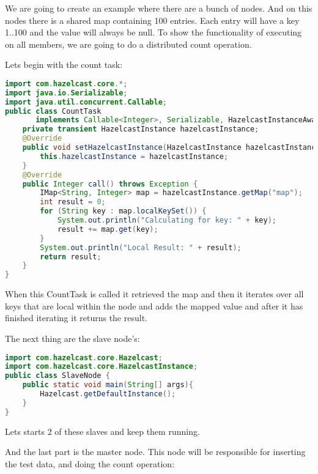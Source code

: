 We are going to create an example where there are a bunch of nodes. And on this nodes there is a shared map containing 100 entries. Each entry will have a key 1..100 and the value will always be null. To show the functionality of executing on all members, we are going to do a distributed count operation.

Lets begin with the count task:
\begin{lstlisting}[language=java]
import com.hazelcast.core.*;
import java.io.Serializable;
import java.util.concurrent.Callable;
public class CountTask 
       implements Callable<Integer>, Serializable, HazelcastInstanceAware {
    private transient HazelcastInstance hazelcastInstance;
    @Override
    public void setHazelcastInstance(HazelcastInstance hazelcastInstance) {
        this.hazelcastInstance = hazelcastInstance;
    }
    @Override
    public Integer call() throws Exception {
        IMap<String, Integer> map = hazelcastInstance.getMap("map");
        int result = 0;
        for (String key : map.localKeySet()) {
            System.out.println("Calculating for key: " + key);
            result += map.get(key);
        }
        System.out.println("Local Result: " + result);
        return result;
    }
}

\end{lstlisting}
When this CountTask is called it retrieved the map and then it iterates over all keys that are local within the node and adds the mapped value and after it has finished iterating it returns the result.

The next thing are the slave node's:
\begin{lstlisting}[language=java]
import com.hazelcast.core.Hazelcast;
import com.hazelcast.core.HazelcastInstance;
public class SlaveNode {
    public static void main(String[] args){
        Hazelcast.getDefaultInstance();
    }
}
\end{lstlisting}
Lets starts 2 of these slaves and keep them running.

And the last part is the master node. This node will be responsible for inserting the test data, and doing the count operation:

